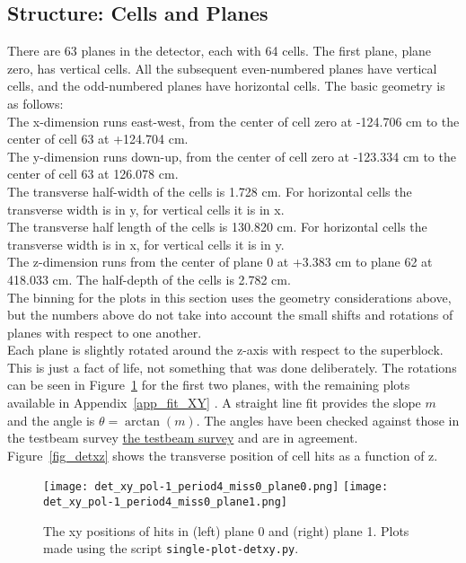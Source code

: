 \subsection{Structure: Cells and Planes}
\noindent
There are 63 planes in the detector, each with 64 cells. The first plane, plane zero, has vertical cells. All the subsequent even-numbered planes have vertical cells, and the odd-numbered planes have horizontal cells. The basic geometry is as follows:\\[1ex]
The x-dimension runs east-west, from the center of cell zero at -124.706 cm to the center of cell 63 at +124.704 cm.\\
The y-dimension runs down-up, from the center of cell zero at -123.334 cm to the center of cell 63 at 126.078 cm.\\
The transverse half-width of the cells is 1.728 cm. For horizontal cells the transverse width is in y, for vertical cells it is in x.\\
The transverse half length of the cells is 130.820 cm. For horizontal cells the transverse width is in x, for vertical cells it is in y.\\
The z-dimension runs from the center of plane 0 at +3.383 cm to plane 62 at 418.033 cm. The half-depth of the cells is 2.782 cm.  \\
\noindent
The binning for the plots in this section uses the geometry considerations above, but the numbers above do not take into account the small shifts and rotations of planes with respect to one another.\\
\noindent
Each plane is slightly rotated around the z-axis with respect to the superblock. This is just a fact of life, not something that was done deliberately. The rotations can be seen in Figure~\ref{fig_dethit_plane01}  for the first two planes, with the remaining plots available in Appendix~\ref{app_fit_XY}  . A straight line fit provides the slope $m$ and the angle is $\theta= \arctan(m)$. The angles have been checked against those in the testbeam survey \href{https://github.com/novaexperiment/novasoft/blob/main/Geometry/gdml/tbscripts/tb_survey.txt}{the testbeam survey} and are in agreement.  Figure~\ref{fig_detxz} shows the transverse position of cell hits as a function of z.  
  



 \begin{figure}	   
 \centering
        	\texttt{[image: det\_xy\_pol-1\_period4\_miss0\_plane0.png]}
	\texttt{[image: det\_xy\_pol-1\_period4\_miss0\_plane1.png]}
		 \caption{The xy positions of hits in (left) plane 0 and (right) plane 1. Plots made using the script \texttt{single-plot-detxy.py}.}	
   \label{fig_dethit_plane01}
  \end{figure}

